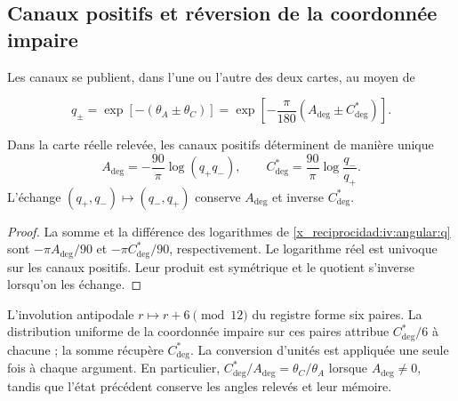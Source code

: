 \subsection{Canaux positifs et réversion de la coordonnée impaire}
\label{x_reciprocidad:iv:angular:canales}

Les canaux se publient, dans l’une ou l’autre des deux cartes, au moyen de

\begin{equation}
 q_\pm=\exp[-(\theta_A\pm\theta_C)]
 =\exp\!\left[-\frac{\pi}{180}
                   (A_{\deg}\pm C^*_{\deg})\right].
 \label{x_reciprocidad:iv:angular:q}
\end{equation}

\begin{proposition}
\label{x_reciprocidad:iv:angular:inversion}
Dans la carte réelle relevée, les canaux positifs déterminent
de manière unique
\begin{equation}
 A_{\deg}=-\frac{90}{\pi}\log(q_+q_-),\qquad
 C^*_{\deg}=\frac{90}{\pi}\log\frac{q_-}{q_+}.
 \label{x_reciprocidad:iv:angular:recuperacion}
\end{equation}
L'échange \((q_+,q_-)\mapsto(q_-,q_+)\) conserve
\(A_{\deg}\) et inverse \(C^*_{\deg}\).
\end{proposition}
\begin{proof}
La somme et la différence des logarithmes de
\eqref{x_reciprocidad:iv:angular:q} sont \(-\pi A_{\deg}/90\) et
\(-\pi C^*_{\deg}/90\), respectivement. Le logarithme réel
est univoque sur les canaux positifs. Leur produit est symétrique
et le quotient s’inverse lorsqu’on les échange.
\end{proof}

L’involution antipodale \(r\mapsto r+6\pmod {12}\) du
registre forme six paires. La distribution uniforme de la
coordonnée impaire sur ces paires attribue
\(C^*_{\deg}/6\) à chacune ; la somme récupère
\(C^*_{\deg}\). La conversion d’unités est appliquée une
seule fois à chaque argument. En particulier,
\(C^*_{\deg}/A_{\deg}=\theta_C/\theta_A\) lorsque
\(A_{\deg}\ne0\), tandis que l’état précédent conserve
les angles relevés et leur mémoire.

